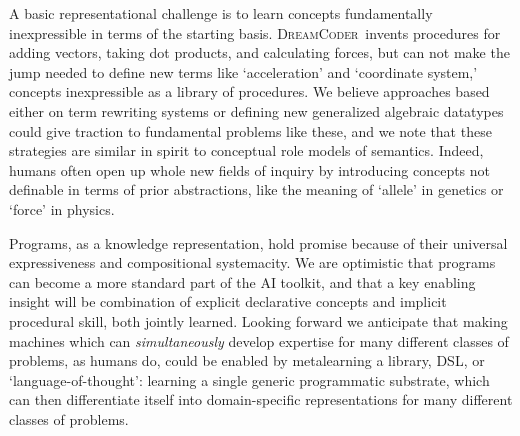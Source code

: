 \documentclass{article}
\newcommand{\system}{\textsc{DreamCoder}~}
\begin{document}


A basic representational challenge is to
learn concepts fundamentally inexpressible in terms of the starting basis. \system invents procedures for
adding vectors, taking dot products, and calculating forces,
but can not make the jump needed to define new terms like `acceleration' and `coordinate system,'
concepts inexpressible as a library of procedures.
We believe approaches based either on term rewriting systems or defining new generalized algebraic datatypes could give traction to fundamental problems like these,
and we note that these strategies are similar in spirit to conceptual role models of semantics.
Indeed, humans often open up whole new fields of inquiry by introducing concepts not
definable in terms of prior abstractions,
like the meaning of `allele' in genetics
or `force' in physics.

Programs, as a knowledge representation,
hold promise because of their universal expressiveness and
compositional systemacity.
We are optimistic that programs can become a more standard part of the AI toolkit,
and that a key enabling insight will be combination of
explicit declarative concepts and implicit procedural skill, both jointly learned.
Looking forward we anticipate that making machines which can \emph{simultaneously}
develop expertise for many different classes of problems, as humans do,
could be enabled by metalearning a library, DSL, or `language-of-thought':
learning a single generic programmatic substrate,
which can then differentiate itself into domain-specific
representations for many different classes of problems.




\end{document}

